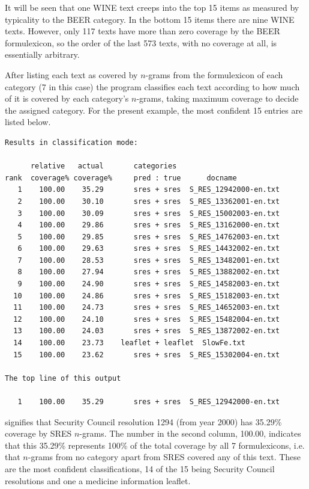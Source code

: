 \documentclass[output=paper]{langscibook}
\begin{document}
It will be seen that one WINE text creeps into the top 15 items as measured by typicality to the BEER category. In the bottom 15 items there are nine WINE texts. However, only 117 texts have more than zero coverage by the BEER formulexicon, so the order of the last 573 texts, with no coverage at all, is essentially arbitrary.

After listing each text as covered by $n$-grams from the formulexicon of each category (7 in this case) the program classifies each text according to how much of it is covered by each category's $n$-grams, taking maximum coverage to decide the assigned category. For the present example, the most confident 15 entries are listed below.

\begin{lstlisting}[basicstyle=\small\ttfamily]
Results in classification mode:

      relative   actual       categories
rank  coverage% coverage%     pred : true      docname
   1    100.00    35.29       sres + sres  S_RES_12942000-en.txt
   2    100.00    30.10       sres + sres  S_RES_13362001-en.txt
   3    100.00    30.09       sres + sres  S_RES_15002003-en.txt
   4    100.00    29.86       sres + sres  S_RES_13162000-en.txt
   5    100.00    29.85       sres + sres  S_RES_14762003-en.txt
   6    100.00    29.63       sres + sres  S_RES_14432002-en.txt
   7    100.00    28.53       sres + sres  S_RES_13482001-en.txt
   8    100.00    27.94       sres + sres  S_RES_13882002-en.txt
   9    100.00    24.90       sres + sres  S_RES_14582003-en.txt
  10    100.00    24.86       sres + sres  S_RES_15182003-en.txt
  11    100.00    24.73       sres + sres  S_RES_14652003-en.txt
  12    100.00    24.10       sres + sres  S_RES_15482004-en.txt
  13    100.00    24.03       sres + sres  S_RES_13872002-en.txt
  14    100.00    23.73    leaflet + leaflet  SlowFe.txt
  15    100.00    23.62       sres + sres  S_RES_15302004-en.txt

The top line of this output

   1    100.00    35.29       sres + sres  S_RES_12942000-en.txt
\end{lstlisting}

signifies that Security Council resolution 1294 (from year 2000) has 35.29\% coverage by SRES $n$-grams. The number in the second column, 100.00, indicates that this 35.29\% represents 100\% of the total coverage by all 7 formulexicons, i.e. that $n$-grams from no category apart from SRES covered any of this text. These are the most confident classifications, 14 of the 15 being Security Council resolutions and one a medicine information leaflet.
\end{document}
